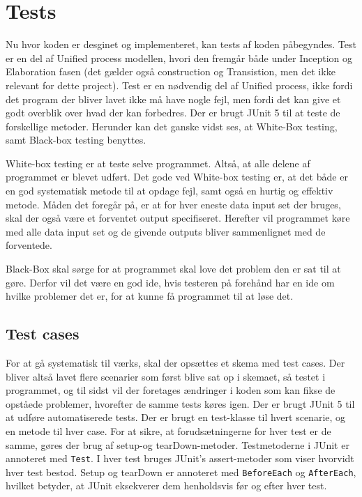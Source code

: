 \chapter{Tests}\label{ch:tests}
Nu hvor koden er desginet og implementeret, kan tests af koden påbegyndes. Test er en del af Unified process modellen, hvori den fremgår både under Inception og Elaboration fasen (det gælder også construction og Transistion, men det ikke relevant for dette project). Test er en nødvendig del af Unified process, ikke fordi det program der bliver lavet ikke må have nogle fejl, men fordi det kan give et godt overblik over hvad der kan forbedres\cite{sestoft2008systematic}. Der er brugt JUnit 5 til at teste de forskellige metoder. Herunder kan det ganske vidst ses, at White-Box testing, samt Black-box testing benyttes. 

White-box testing er at teste selve programmet. Altså, at alle delene af programmet er blevet udført. Det gode ved White-box testing er, at det både er en god systematisk metode til at opdage fejl, samt også en hurtig og effektiv metode. Måden det foregår på, er at for hver eneste data input set der bruges, skal der også være et forventet output specifiseret. Herefter vil programmet køre med alle data input set og de givende outputs bliver sammenlignet med de forventede\cite{sestoft2008systematic}.

Black-Box skal sørge for at programmet skal love det problem den er sat til at gøre. Derfor vil det være en god ide, hvis testeren på forehånd har en ide om hvilke problemer det er, for at kunne få programmet til at løse det\cite{sestoft2008systematic}. 

\section{Test cases}
For at gå systematisk til værks, skal der opsættes et skema med test cases\cite{Heumann}. Der bliver altså lavet flere scenarier som først blive sat op i skemaet, så testet i programmet, og til sidst vil der foretages ændringer i koden som kan fikse de opståede problemer, hvorefter de samme tests køres igen.
Der er brugt JUnit 5 \cite{JUnit} til at udføre automatiserede tests. Der er brugt en test-klasse til hvert scenarie, og en metode til hver case. For at sikre, at forudsætningerne for hver test er de samme, gøres der brug af setup-og tearDown-metoder. Testmetoderne i JUnit er annoteret med \verb|Test|. I hver test bruges JUnit’s assert-metoder som viser hvorvidt hver test bestod. Setup og tearDown er annoteret med \verb|BeforeEach| og \verb|AfterEach|, hvilket betyder, at JUnit eksekverer dem henholdsvis før og efter hver test\cite{MiniprojektTest}.

